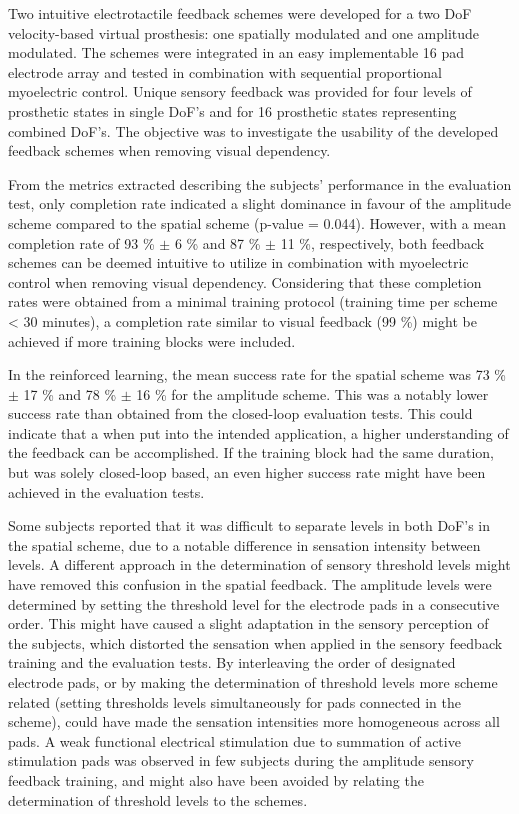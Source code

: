 Two intuitive electrotactile feedback schemes were developed for a two DoF velocity-based virtual prosthesis: one spatially modulated and one amplitude modulated. The schemes were integrated in an easy implementable 16 pad electrode array and tested in combination with sequential proportional myoelectric control. Unique sensory feedback was provided for four levels of prosthetic states in single DoF's and for 16 prosthetic states representing combined DoF's. The objective was to investigate the usability of the developed feedback schemes when removing visual dependency.

From the metrics extracted describing the subjects' performance in the evaluation test, only completion rate indicated a slight  dominance in favour of the amplitude scheme compared to the spatial scheme (p-value = 0.044). However, with a mean completion rate of 93 \% $\pm$ 6 \% and 87 \% $\pm$ 11 \%, respectively, both feedback schemes can be deemed intuitive to utilize in combination with myoelectric control when removing visual dependency. Considering that these completion rates were obtained from a minimal training protocol (training time per scheme < 30 minutes), a completion rate similar to visual feedback (99 \%) might be achieved if more training blocks were included.

In the reinforced learning, the mean success rate for the spatial scheme was 73 \%  $\pm$ 17 \% and 78 \%  $\pm$ 16 \% for the amplitude scheme. This was a notably lower success rate than obtained from the closed-loop evaluation tests. This could indicate that a when put into the intended application, a higher understanding of the feedback can be accomplished. If the training block had the same duration, but was solely closed-loop based, an even higher success rate might have been achieved in the evaluation tests. 

Some subjects reported that it was difficult to separate levels in both DoF's in the spatial scheme, due to a notable difference in sensation intensity between levels. A different approach in the determination of sensory threshold levels might have removed this confusion in the spatial feedback. The amplitude levels were determined by setting the threshold level for the electrode pads in a consecutive order. This might have caused a slight adaptation in the sensory perception of the subjects, which distorted the sensation when applied in the sensory feedback training and the evaluation tests. By interleaving the order of designated electrode pads, or by making the determination of threshold levels more scheme related (setting thresholds levels simultaneously for pads connected in the scheme), could have made the sensation intensities more homogeneous across all pads. A weak functional electrical stimulation due to summation of active stimulation pads was observed in few subjects during the amplitude sensory feedback training, and might also have been avoided by relating the determination of threshold levels to the schemes. 

